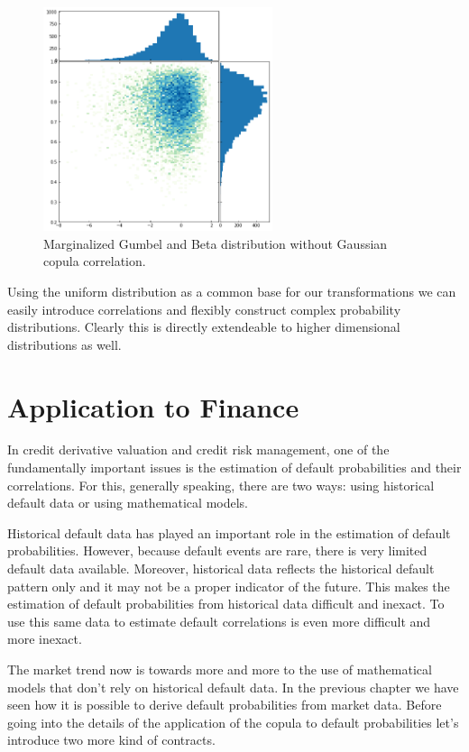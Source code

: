     \begin{figure}[htbp]
    \centering
    \includegraphics[width=0.6\textwidth]{copula_files/copula_15_0.png}
    \caption{Marginalized Gumbel and Beta distribution without Gaussian copula correlation.}
    \label{fig:beta_gumbel_nocorr}
    \end{figure}
    
    Using the uniform distribution as a common base for our transformations
we can easily introduce correlations and flexibly construct complex
probability distributions. Clearly this is directly extendeable to
higher dimensional distributions as well.

\section{Application to Finance}\label{application-to-finance}

In credit derivative valuation and credit risk management, one of the
fundamentally important issues is the estimation of default
probabilities and their correlations. For this, generally speaking,
there are two ways: using historical default data or using mathematical
models.

Historical default data has played an important role in the estimation
of default probabilities. However, because default events are rare,
there is very limited default data available. Moreover, historical data
reflects the historical default pattern only and it may not be a proper
indicator of the future. This makes the estimation of default
probabilities from historical data difficult and inexact. To use this
same data to estimate default correlations is even more difficult and
more inexact.

The market trend now is towards more and more to the use of mathematical
models that don't rely on historical default data. In the previous
chapter we have seen how it is possible to derive default probabilities
from market data. Before going into the details of the application of
the copula to default probabilities let's introduce two more kind of
contracts.


